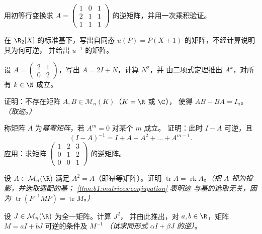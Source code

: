 \begin{exercise}[$\star$]\label{exo:b1:matrices:3}
用初等行变换求 $A = \begin{pmatrix} 1 & 0 & 1\\ 2 & 1 &
1\\ 1 & 1 & 1 \end{pmatrix}$ 的逆矩阵，并用一次乘积验证。
\end{exercise}

\begin{exercise}[$\star$]\label{exo:b1:matrices:4}
在 $\R_2[X]$ 的标准基下，写出自同态
$u(P) = P(X + 1)$ 的矩阵，不经计算说明其为何可逆，
并给出 $u^{-1}$ 的矩阵。
\end{exercise}

\begin{exercise}[$\star\star$]\label{exo:b1:matrices:5}
设 $A = \begin{pmatrix} 2 & 1 \\ 0 & 2\end{pmatrix}$，写出 $A =
2I + N$，计算 $N^2$，并
由二项式定理推出 $A^k$，对所有 $k \in \N$ 成立。
\end{exercise}

\begin{exercise}[$\star\star$]\label{exo:b1:matrices:6}
证明：不存在矩阵 $A, B \in \mathcal{M}_n(K)$（$K = \R$ 或 $\C$），
使得 $AB - BA = I_n$。\emph{（取迹。）}
\end{exercise}

\begin{exercise}[$\star\star$]\label{exo:b1:matrices:7}
称矩阵 $A$ 为\emph{幂零矩阵}，若 $A^m = 0$ 对某个 $m$ 成立。
证明：此时 $I - A$ 可逆，且
\[
(I - A)^{-1} = I + A + A^2 + \dots + A^{m-1} .
\]
应用：求矩阵 $\begin{pmatrix} 1 & 2 & 3\\ 0 & 1 & 2\\ 0 & 0 &
1\end{pmatrix}$ 的逆矩阵。
\end{exercise}

\begin{exercise}[$\star\star$]\label{exo:b1:matrices:8}
设 $A \in \mathcal{M}_n(\R)$ 满足 $A^2 = A$（即幂等矩阵）。证明
$\operatorname{tr} A = \operatorname{rk} A$。\emph{（把
$A$ 视为投影，并选取适配的基；
\cref{thm:b1:matrices:conjugation} 表明迹
与基的选取无关，因为 $\operatorname{tr}(P^{-1}MP) =
\operatorname{tr} M$。）}
\end{exercise}

\begin{exercise}[$\star\star\star$]\label{exo:b1:matrices:9}
设 $J \in \mathcal{M}_n(\R)$ 为全一矩阵。计算 $J^2$，
并由此推出，对 $a, b \in \R$，矩阵 $M
= aI + bJ$ 可逆的条件及 $M^{-1}$ \emph{（试求同形式
$\alpha I + \beta J$ 的逆）}。
\end{exercise}

